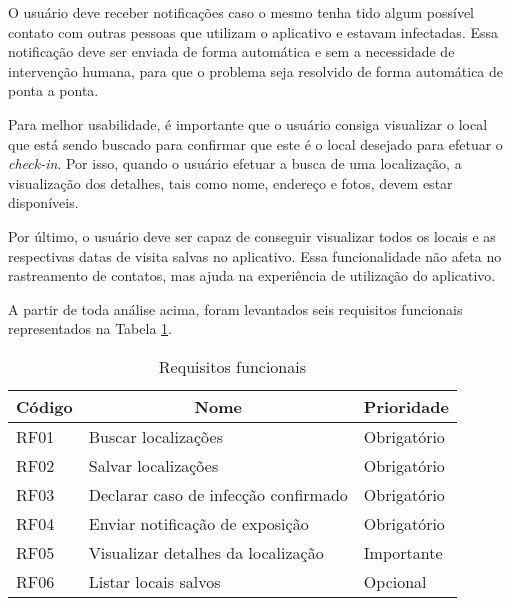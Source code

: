 O usuário deve receber notificações caso o mesmo tenha tido algum possível contato com outras pessoas que utilizam o aplicativo e estavam infectadas. Essa notificação deve ser enviada de forma automática e sem a necessidade de intervenção humana, para que o problema seja resolvido de forma automática de ponta a ponta.

Para melhor usabilidade, é importante que o usuário consiga visualizar o local que está sendo buscado para confirmar que este é o local desejado para efetuar o \textit{check-in}. Por isso, quando o usuário efetuar a busca de uma localização, a visualização dos detalhes, tais como nome, endereço e fotos, devem estar disponíveis. 

Por último, o usuário deve ser capaz de conseguir visualizar todos os locais e as respectivas datas de visita salvas no aplicativo. Essa funcionalidade não afeta no rastreamento de contatos, mas ajuda na experiência de utilização do aplicativo.

A partir de toda análise acima, foram levantados seis requisitos funcionais representados na Tabela \ref{tab:tabelaf}.

\begin{table}[!htb]
\caption[Tabela de requisitos funcionais]{Requisitos funcionais}
\label{tab:tabelaf}
\begin{center}
\begin{tabular}{|l|l|l|}
\hline
\multicolumn{1}{|c|}{\textbf{Código}} & \multicolumn{1}{c|}{\textbf{Nome}}   & \multicolumn{1}{c|}{\textbf{Prioridade}} \\ \hline
RF01                                  & Buscar localizações                  & Obrigatório                              \\ \hline
RF02                                  & Salvar localizações                  & Obrigatório                              \\ \hline
RF03                                  & Declarar caso de infecção confirmado & Obrigatório                              \\ \hline
RF04                                  & Enviar notificação de exposição      & Obrigatório                              \\ \hline
RF05                                  & Visualizar detalhes da localização   & Importante                               \\ \hline
RF06                                  & Listar locais salvos                 & Opcional                                 \\ \hline
\end{tabular}
\end{center}
\end{table}

